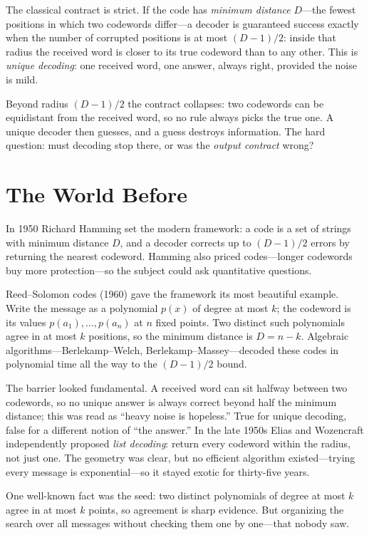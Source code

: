 The classical contract is strict. If the code has \emph{minimum distance} $D$---the fewest positions in which two codewords differ---a decoder is guaranteed success exactly when the number of corrupted positions is at most $(D-1)/2$: inside that radius the received word is closer to its true codeword than to any other. This is \emph{unique decoding}: one received word, one answer, always right, provided the noise is mild.

Beyond radius $(D-1)/2$ the contract collapses: two codewords can be equidistant from the received word, so no rule always picks the true one. A unique decoder then guesses, and a guess destroys information. The hard question: must decoding stop there, or was the \emph{output contract} wrong?

\section{The World Before}

In 1950 Richard Hamming set the modern framework: a code is a set of strings with minimum distance $D$, and a decoder corrects up to $(D-1)/2$ errors by returning the nearest codeword. Hamming also priced codes---longer codewords buy more protection---so the subject could ask quantitative questions.

Reed--Solomon codes (1960) gave the framework its most beautiful example. Write the message as a polynomial $p(x)$ of degree at most $k$; the codeword is its values $p(a_1),\dots,p(a_n)$ at $n$ fixed points. Two distinct such polynomials agree in at most $k$ positions, so the minimum distance is $D=n-k$. Algebraic algorithms---Berlekamp--Welch, Berlekamp--Massey---decoded these codes in polynomial time all the way to the $(D-1)/2$ bound.

The barrier looked fundamental. A received word can sit halfway between two codewords, so no unique answer is always correct beyond half the minimum distance; this was read as ``heavy noise is hopeless.'' True for unique decoding, false for a different notion of ``the answer.'' In the late 1950s Elias and Wozencraft independently proposed \emph{list decoding}: return every codeword within the radius, not just one. The geometry was clear, but no efficient algorithm existed---trying every message is exponential---so it stayed exotic for thirty-five years.

One well-known fact was the seed: two distinct polynomials of degree at most $k$ agree in at most $k$ points, so agreement is sharp evidence. But organizing the search over all messages without checking them one by one---that nobody saw.

